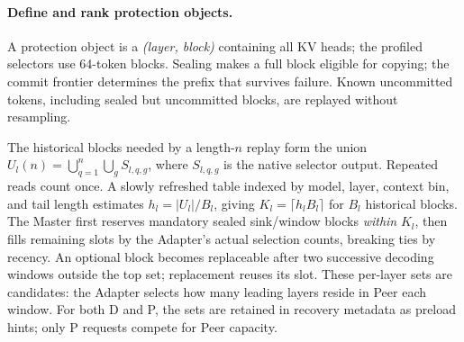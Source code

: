 \paragraph{Define and rank protection objects.}
A protection object is a \emph{(layer, block)} containing all KV heads;
the profiled selectors use 64-token blocks. Sealing makes a full block
eligible for copying; the commit frontier determines the prefix that
survives failure. Known uncommitted tokens, including sealed but
uncommitted blocks, are replayed without resampling.

The historical blocks needed by a length-$n$ replay form the union
$U_l(n)=\bigcup_{q=1}^{n}\bigcup_g S_{l,q,g}$, where $S_{l,q,g}$ is the
native selector output. Repeated reads count once. A slowly refreshed
table indexed by model, layer, context bin, and tail length estimates
$h_l=|U_l|/B_l$, giving $K_l=\lceil h_lB_l\rceil$ for $B_l$ historical
blocks. The Master first reserves mandatory sealed sink/window blocks
\emph{within} $K_l$, then fills remaining slots by the Adapter's actual
selection counts, breaking ties by recency. An optional block becomes
replaceable after two successive decoding windows outside the top set;
replacement reuses its slot. These per-layer sets are candidates: the
Adapter selects how many leading layers reside in Peer each window.
For both D and P, the sets are retained in recovery metadata as preload
hints; only P requests compete for Peer capacity.

